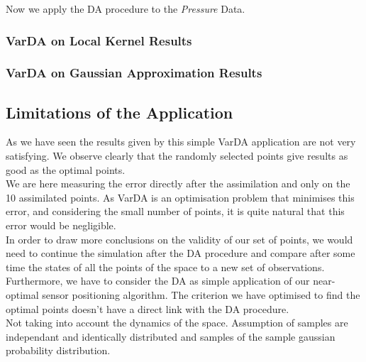 Now we apply the DA procedure to the \textit{Pressure} Data. 

\subsubsection{VarDA on Local Kernel Results}

\subsubsection{VarDA on Gaussian Approximation Results}





\subsection{Limitations of the Application}

As we have seen the results given by this simple VarDA application are not very satisfying. We observe clearly that the randomly selected points give results as good as the optimal points. \\

We are here measuring the error directly after the assimilation and only on the 10 assimilated points. As VarDA is an optimisation problem that minimises this error, and considering the small number of points, it is quite natural that this error would be negligible.  \\

In order to draw more conclusions on the validity of our set of points, we would need to continue the simulation after the DA procedure and compare after some time the states of all the points of the space to a new set of observations. \\

 Furthermore, we have to consider the DA as simple application of our near-optimal sensor positioning algorithm. The criterion we have optimised to find the optimal points doesn't have a direct link with the DA procedure. \\
 
 Not taking into account the dynamics of the space. Assumption of samples are independant and identically distributed and samples of the sample gaussian probability distribution. 



